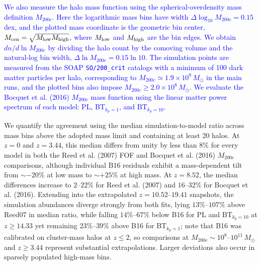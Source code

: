 \documentclass[
 reprint,
 superscriptaddress,
 nofootinbib,
 nobibnotes,
 amsmath,
 amssymb,
 aps,
 prd,
 floatfix,
 longbibliography
]{revtex4-2}
\DeclareRobustCommand{\change}[1]{\textcolor{blue}{#1}}
\DeclareRobustCommand{\BTKPone}{\ensuremath{\mathrm{BT}_{k_p=1}}}
\DeclareRobustCommand{\BTKPten}{\ensuremath{\mathrm{BT}_{k_p=10}}}
\begin{document}

\change{We also measure the halo mass function using the spherical-overdensity mass definition \(M_{200c}\). Here the logarithmic mass bins have width \(\Delta\log_{10}M_{200c}=0.15\) dex, and the plotted mass coordinate is the geometric bin center, \(M_{\rm cen}=\sqrt{M_{\rm low}M_{\rm high}}\), where \(M_{\rm low}\) and \(M_{\rm high}\) are the bin edges. We obtain \(dn/d\ln M_{200c}\) by dividing the halo count by the comoving volume and the natural-log bin width, \(\Delta\ln M_{200c}=0.15\ln 10\). The simulation points are measured from the SOAP \texttt{SO/200\_crit} catalogs with a minimum of 100 dark matter particles per halo, corresponding to \(M_{200c}\simeq1.9\times10^8\,M_\odot\) in the main runs, and the plotted bins also impose \(M_{200c}\ge2.0\times10^8\,M_\odot\). We evaluate the Bocquet et al. (2016) \(M_{200c}\) mass function \citep{Bocquet2016} using the linear matter power spectrum of each model: PL, \BTKPone{}, and \BTKPten{}.}

We quantify the agreement using the median simulation-to-model ratio across mass bins above the adopted mass limit and containing at least 20 halos. At \(z=0\) and \(z=3.44\), this median differs from unity by less than \(8\%\) for every model in both the Reed et al. (2007) FOF and Bocquet et al. (2016) \(M_{200c}\) comparisons, although individual B16 residuals exhibit a mass-dependent tilt from \(\sim-20\%\) at low mass to \(\sim+25\%\) at high mass. At \(z=8.52\), the median differences increase to \(2\)--\(22\%\) for Reed et al. (2007) and \(16\)--\(32\%\) for Bocquet et al. (2016). Extending into the extrapolated \(z=10.52\)--\(19.41\) snapshots, the simulation abundances diverge strongly from both fits, lying \(13\%\)--\(107\%\) above Reed07 in median ratio, while falling \(14\%\)--\(67\%\) below B16 for PL and \BTKPten{} at \(z\ge14.33\) yet remaining \(23\%\)--\(39\%\) above B16 for \BTKPone{}; note that B16 was calibrated on cluster-mass halos at \(z\le2\), so comparisons at \(M_{200c}\sim10^8\)--\(10^{11}\,M_\odot\) and \(z\ge3.44\) represent substantial extrapolations. Larger deviations also occur in sparsely populated high-mass bins.
\end{document}
